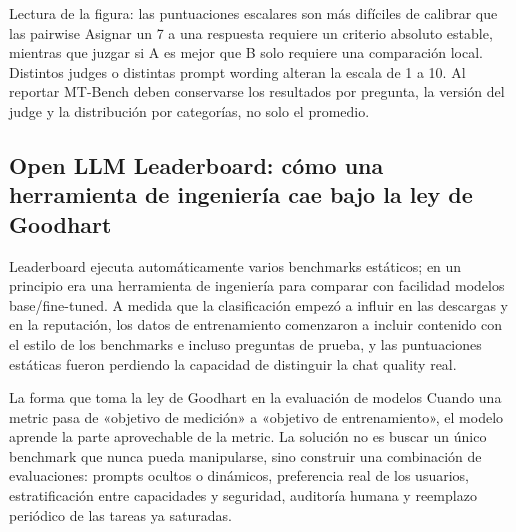 

\begin{knowledgebox}{Lectura de la figura: las puntuaciones escalares son más difíciles de calibrar que las pairwise}
Asignar un 7 a una respuesta requiere un criterio absoluto estable, mientras que juzgar si A es mejor que B solo requiere una comparación local. Distintos judges o distintas prompt wording alteran la escala de 1 a 10. Al reportar MT-Bench deben conservarse los resultados por pregunta, la versión del judge y la distribución por categorías, no solo el promedio.
\end{knowledgebox}


\subsection{Open LLM Leaderboard: cómo una herramienta de ingeniería cae bajo la ley de Goodhart}

Leaderboard ejecuta automáticamente varios benchmarks estáticos; en un principio era una herramienta de ingeniería para comparar con facilidad modelos base/fine-tuned. A medida que la clasificación empezó a influir en las descargas y en la reputación, los datos de entrenamiento comenzaron a incluir contenido con el estilo de los benchmarks e incluso preguntas de prueba, y las puntuaciones estáticas fueron perdiendo la capacidad de distinguir la chat quality real.



\begin{importantbox}{La forma que toma la ley de Goodhart en la evaluación de modelos}
Cuando una metric pasa de «objetivo de medición» a «objetivo de entrenamiento», el modelo aprende la parte aprovechable de la metric. La solución no es buscar un único benchmark que nunca pueda manipularse, sino construir una combinación de evaluaciones: prompts ocultos o dinámicos, preferencia real de los usuarios, estratificación entre capacidades y seguridad, auditoría humana y reemplazo periódico de las tareas ya saturadas.
\end{importantbox}

